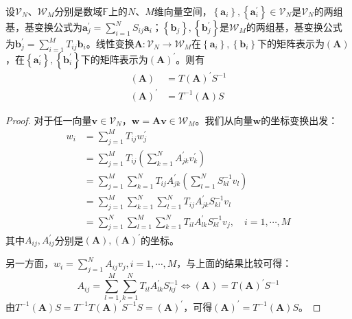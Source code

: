 \documentclass[main.tex]{subfiles}
\begin{document}
\begin{theorem}
设$\mathcal{V}_N$、$\mathcal{W}_M$分别是数域$\mathbb{F}$上的$N$、$M$维向量空间，$\left\{\mathbf{a}_i\right\},\left\{\mathbf{a}^\prime_i\right\}\in\mathcal{V}_N$是$\mathcal{V}_N$的两组基，基变换公式为$\mathbf{a}^\prime_j=\sum_{i=1}^NS_{ij}\mathbf{a}_i$；$\left\{\mathbf{b}_j\right\},\left\{\mathbf{b}^\prime_j\right\}$是$\mathcal{W}_M$的两组基，基变换公式为$\mathbf{b}^\prime_j=\sum_{i=1}^MT_{ij}\mathbf{b}_i$。线性变换$\mathbf{A}:\mathcal{V}_N\rightarrow\mathcal{W}_M$在$\left\{\mathbf{a}_i\right\},\left\{\mathbf{b}_i\right\}$下的矩阵表示为$\left(\mathbf{A}\right)$，在$\left\{\mathbf{a}^\prime_i\right\},\left\{\mathbf{b}^\prime_i\right\}$下的矩阵表示为$\left(\mathbf{A}\right)^\prime$。则有
\begin{align*}
    \left(\mathbf{A}\right)&=T\left(\mathbf{A}\right)^\prime S^{-1}\\
    \left(\mathbf{A}\right)^\prime&=T^{-1}\left(\mathbf{A}\right)S
\end{align*}
\end{theorem}
\begin{proof}
对于任一向量$\mathbf{v}\in\mathcal{V}_N$，$\mathbf{w}=\mathbf{Av}\in\mathcal{W}_M$。我们从向量$\mathbf{w}$的坐标变换出发：
\begin{align*}
    w_i&=\sum_{j=1}^MT_{ij}w^\prime_j\\
    &=\sum_{j=1}^MT_{ij}\left(\sum_{k=1}^NA^\prime_{jk}v^\prime_k\right)\\
    &=\sum_{j=1}^M\sum_{k=1}^NT_{ij}A^\prime_{jk}\left(\sum_{l=1}^NS^{-1}_{kl}v_l\right)\\
    &=\sum_{j=1}^M\sum_{k=1}^N\sum_{l=1}^NT_{ij}A^\prime_{jk}S^{-1}_{kl}v_l\\
    &=\sum_{j=1}^N\sum_{l=1}^M\sum_{k=1}^NT_{il}A^\prime_{lk}S^{-1}_{kl}v_j,\quad i=1,\cdots,M
\end{align*}
其中$A_{ij},A^\prime_{ij}$分别是$\left(\mathbf{A}\right),\left(\mathbf{A}\right)^\prime$的坐标。

另一方面，$w_i=\sum_{j=1}^NA_{ij}v_j,i=1,\cdots,M$，与上面的结果比较可得：
\[
A_{ij}=\sum_{l=1}^M\sum_{k=1}^NT_{il}A^\prime_{lk}S^{-1}_{kj}
\Leftrightarrow \left(\mathbf{A}\right)=T\left(\mathbf{A}\right)^\prime S^{-1}
\]
由$T^{-1}\left(\mathbf{A}\right)S=T^{-1}T\left(\mathbf{A}\right)^\prime S^{-1}S=\left(\mathbf{A}\right)^\prime$，可得$\left(\mathbf{A}\right)^\prime=T^{-1}\left(\mathbf{A}\right)S$。
\end{proof}
\end{document}
